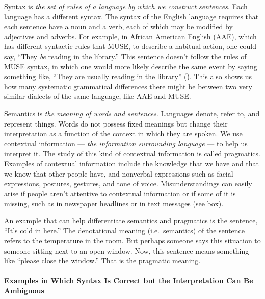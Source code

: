 \documentclass[
]{krantz}
\begin{document}
\hyperref[syntax]{Syntax} is \emph{the set of rules of a language by which we construct sentences}. Each language has a different syntax. The syntax of the English language requires that each sentence have a noun and a verb, each of which may be modified by adjectives and adverbs. For example, in African American English (AAE), which has different syntactic rules that MUSE, to describe a habitual action, one could say, ``They \emph{be} reading in the library.'' This sentence doesn't follow the rules of MUSE syntax, in which one would more likely describe the same event by saying something like, ``They are usually reading in the library'' (). This also shows us how many systematic grammatical differences there might be between two very similar dialects of the same language, like AAE and MUSE.

\hyperref[semantics]{Semantics} is \emph{the meaning of words and sentences}. Languages denote, refer to, and represent things. Words do not possess fixed meanings but change their interpretation as a function of the context in which they are spoken. We use contextual information --- \emph{the information surrounding language} --- to help us interpret it. The study of this kind of contextual information is called \hyperref[pragmatics]{pragmatics}. Examples of contextual information include the knowledge that we have and that we know that other people have, and nonverbal expressions such as facial expressions, postures, gestures, and tone of voice. Misunderstandings can easily arise if people aren't attentive to contextual information or if some of it is missing, such as in newspaper headlines or in text messages (see \hyperref[examples-in-which-syntax-is-correct-but-the-interpretation-can-be-ambiguous]{box}).

An example that can help differentiate semantics and pragmatics is the sentence, ``It's cold in here.'' The denotational meaning (i.e.~semantics) of the sentence refers to the temperature in the room. But perhaps someone says this situation to someone sitting next to an open window. Now, this sentence means something like ``please close the window.'' That is the pragmatic meaning.

\paragraph*{Examples in Which Syntax Is Correct but the Interpretation Can Be Ambiguous}\label{examples-in-which-syntax-is-correct-but-the-interpretation-can-be-ambiguous}
\end{document}
